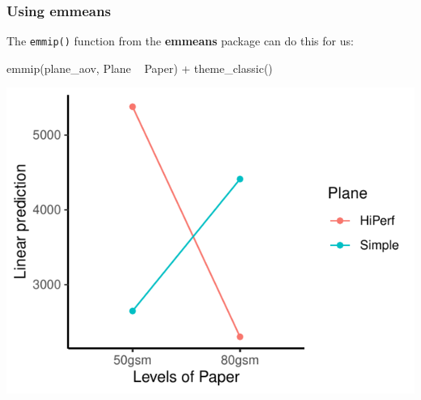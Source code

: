 \documentclass[a4paper]{article}
\begin{document}
\subsubsection{Using emmeans}
The \lstinline|emmip()| function from the \textbf{emmeans} package can do this for us:\\
\begin{minipage}[t]{0.49\textwidth}
\begin{Schunk}
\begin{Sinput}
emmip(plane_aov, Plane ~ Paper) +
  theme_classic()
\end{Sinput}


{\centering \includegraphics[width=\maxwidth]{figure/listings-unnamed-chunk-324-1} 

}

\end{Schunk}
\end{minipage}
\hspace{0.02\textwidth}
\end{document}
